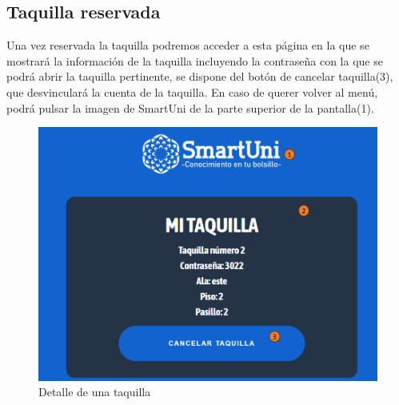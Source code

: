 \documentclass[12pt]{report}
\begin{document}
\begin{appendices}
\section{Taquilla reservada}
Una vez reservada la taquilla podremos acceder a esta página en la que se mostrará la información de la taquilla incluyendo la contraseña con la que se podrá abrir la taquilla pertinente, se dispone del botón de cancelar taquilla(3), que desvinculará la cuenta de la taquilla. En caso de querer volver al menú, podrá pulsar la imagen de SmartUni de la parte superior de la pantalla(1).\\
\begin{figure}[H]
    \centering
    \includegraphics[scale = 0.7]{imagenes//manual_de_usuario/7.png}
    \caption{Detalle de una taquilla}
    \label{fig:enter-label}
\end{figure}
\newpage

\end{appendices}
\end{document}

